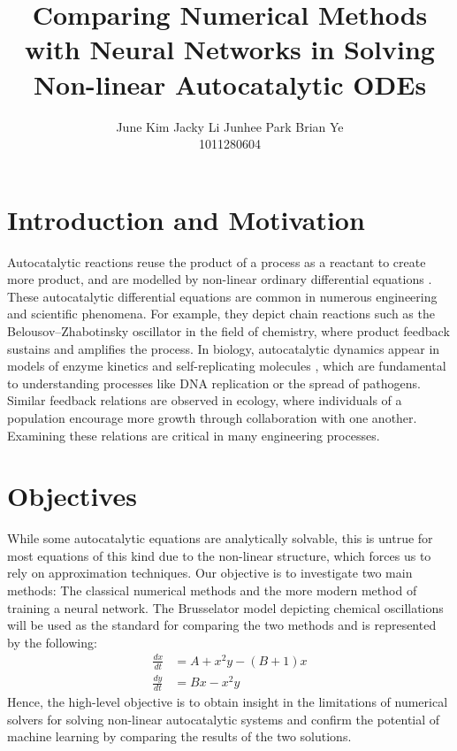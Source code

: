 \documentclass[11pt]{article}
\title{\textbf{Comparing Numerical Methods with Neural Networks in Solving Non-linear Autocatalytic ODEs}}
\author{
June Kim \quad Jacky Li \quad Junhee Park \quad Brian Ye \\
1011280604 \quad 1011271678 \quad 1011120984 \quad 1010834493
}
\date{}
\begin{document}
\maketitle
\vspace{-0.5cm}

\section{Introduction and Motivation}
\vspace{-0.2cm}

Autocatalytic reactions reuse the product of a process as a reactant to create more product, and are modelled by non-linear ordinary differential equations \cite{pekar2021, msmali2019}. These autocatalytic differential equations are common in numerous engineering and scientific phenomena. For example, they depict chain reactions such as the Belousov–Zhabotinsky oscillator \cite{zhabotinsky2007} in the field of chemistry, where product feedback sustains and amplifies the process. In biology, autocatalytic dynamics appear in models of enzyme kinetics and self-replicating molecules \cite{paul2002, wu2009}, which are fundamental to understanding processes like DNA replication or the spread of pathogens. Similar feedback relations are observed in ecology, where individuals of a population encourage more growth through collaboration with one another. Examining these relations are critical in many engineering processes.

\section{Objectives}
\vspace{-0.2cm}

While some autocatalytic equations are analytically solvable, this is untrue for most equations of this kind due to the non-linear structure, which forces us to rely on approximation techniques. Our objective is to investigate two main methods: The classical numerical methods and the more modern method of training a neural network. The Brusselator model \cite{mcdowell2008} depicting chemical oscillations will be used as the standard for comparing the two methods and is represented by the following: 
\begin{align}
\frac{dx}{dt} &= A + x^2y - (B+1)x \\
\frac{dy}{dt} &= Bx - x^2y
\end{align}
Hence, the high-level objective is to obtain insight in the limitations of numerical solvers for solving non-linear autocatalytic systems and confirm the potential of machine learning by comparing the results of the two solutions.
\end{document}
